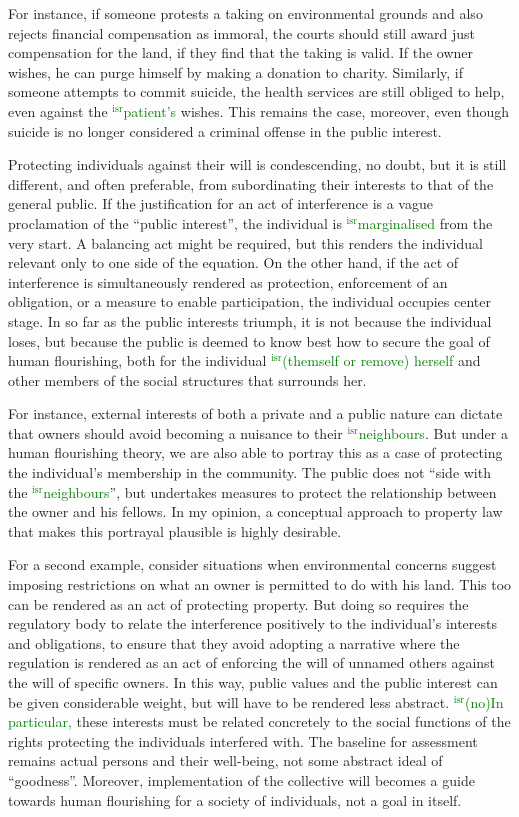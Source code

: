 \documentclass[12pt,a4paper]{book} %
\newcommand{\isr}[1]{\textcolor{green}{$^{\textrm{isr}}${#1}}}
\begin{document}
For instance, if someone protests a taking on environmental grounds and also rejects financial compensation as immoral, the courts should still award just compensation for the land, if they find that the taking is valid. If the owner wishes, he can purge himself by making a donation to charity. Similarly, if someone attempts to commit suicide, the health services are still obliged to help, even against the \isr{patient's} wishes. This remains the case, moreover, even though suicide is no longer considered a criminal offense in the public interest. 

Protecting individuals against their will is condescending, no doubt, but it is still different, and often preferable, from subordinating their interests to that of the general public. If the justification for an act of interference is a vague proclamation of the ``public interest'', the individual is \isr{marginalised} from the very start. A balancing act might be required, but this renders the individual relevant only to one side of the equation. On the other hand, if the act of interference is simultaneously rendered as protection, enforcement of an obligation, or a measure to enable participation, the individual occupies center stage. In so far as the public interests triumph, it is not because the individual loses, but because the public is deemed to know best how to secure the goal of human flourishing, both for the individual \isr{(themself or remove) herself} and other members of the social structures that surrounds her.

For instance, external interests of both a private and a public nature can dictate that owners should avoid becoming a nuisance to their \isr{neighbours}. But under a human flourishing theory, we are also able to portray this as a case of protecting the individual's membership in the community. The public does not ``side with the \isr{neighbours}'', but undertakes measures to protect the relationship between the owner and his fellows. In my opinion, a conceptual approach to property law that makes this portrayal plausible is highly desirable. 

For a second example, consider situations when environmental concerns suggest imposing restrictions on what an owner is permitted to do with his land. This too can be rendered as an act of protecting property. But doing so requires the regulatory body to relate the interference positively to the individual's interests and obligations, to ensure that they avoid adopting a narrative where the regulation is rendered as an act of enforcing the will of unnamed others against the will of specific owners. In this way, public values and the public interest can be given considerable weight, but will have to be rendered less abstract. \isr{(no)In particular,} these interests must be related concretely to the social functions of the rights protecting the individuals interfered with. The baseline for assessment remains actual persons and their well-being, not some abstract ideal of ``goodness''. Moreover, implementation of the collective will becomes a guide towards human flourishing for a society of individuals, not a goal in itself.
\end{document}

